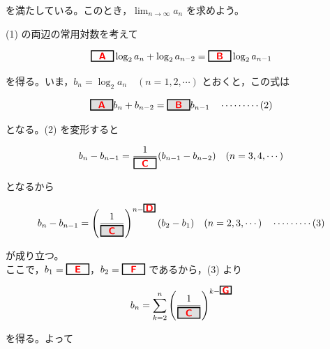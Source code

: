 \documentclass[dvipdfmx,twoside]{jsarticle}
\newcommand{\abb}[1]{%
\begin{tikzpicture}[baseline]
\node[draw=black, 
      rectangle, 
      minimum width=0.8cm, 
      minimum height=0.3cm, 
      fill=gray!25, 
      font=\bfseries,
      line width=1pt,
      inner sep=2pt,
      anchor=base] {#1};
\end{tikzpicture}%
}
\newcommand{\ab}[1]{%
\begin{tikzpicture}[baseline]
\node[draw=black, 
      rectangle, 
      minimum width=0.8cm, 
      minimum height=0.3cm, 
      font=\bfseries,
      line width=1pt,
      inner sep=2pt,
      anchor=base] {#1};
\end{tikzpicture}%
}
\newcommand{\sab}[1]{%
\begin{tikzpicture}[baseline]
\node[draw=black, 
      rectangle, 
      minimum width=0.4cm, 
      minimum height=0.05cm, 
      font=\bfseries,
      line width=1pt,
      inner sep=0.5pt,
      anchor=base] {#1};
\end{tikzpicture}%
}
\begin{document}
\begin{CJK}{UTF8}{ipxm}
を満たしている。このとき，$\displaystyle\lim_{n \to \infty} a_n$ を求めよう。

\vspace{1em}

\indent
(1) の両辺の常用対数を考えて

\vspace{0.5em}

\[
\ab{\color{red}{\textsf{A}}} \log_{2} a_n + \log_{2} a_{n-2} = \ab{\color{red}{\textsf{B}}} \log_{2} a_{n-1}
\]

\vspace{0.3em}

を得る。いま，$b_n = \log_{2} a_n \quad (n = 1, 2, \cdots)$ とおくと，この式は

\vspace{0.5em}

\[
\abb{\color{red}{\textsf{A}}} b_n + b_{n-2} = \abb{\color{red}{\textsf{B}}} b_{n-1} \quad \cdots\cdots\cdots (2)
\]

\vspace{0.3em}

となる。(2) を変形すると

\vspace{0.5em}

\[
b_n - b_{n-1} = \frac{1}{\ab{\color{red}{\textsf{C}}}} (b_{n-1} - b_{n-2}) \quad (n = 3, 4, \cdots)
\]

\vspace{0.3em}

となるから

\vspace{0.5em}

\[
b_n - b_{n-1} = \left( \frac{1}{\abb{\color{red}{\textsf{C}}}} \right)^{n-\sab{\color{red}{\textsf{D}}}} (b_2 - b_1) \quad (n = 2, 3, \cdots) \quad \cdots\cdots\cdots (3)
\]

\vspace{0.3em}

が成り立つ。\\[0.5em]
ここで，$b_1 = \ab{\color{red}{\textsf{E}}}$，$b_2 = \ab{\color{red}{\textsf{F}}}$ であるから，(3) より

\vspace{0.5em}

\[
b_n = \sum_{k=2}^{n} \left( \frac{1}{\abb{\color{red}{\textsf{C}}}} \right)^{k-\sab{\color{red}{\textsf{G}}}}
\]

\vspace{0.3em}

を得る。よって

\vspace{0.5em}


\end{CJK}
\end{document}
